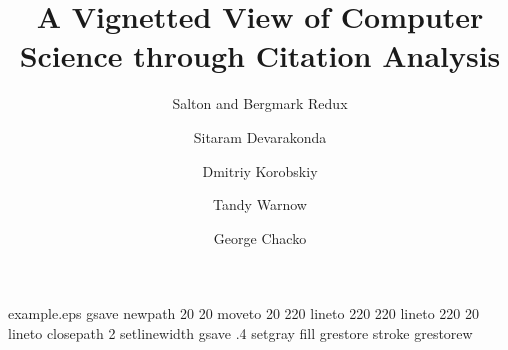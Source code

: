 %
%
%
%
%
\begin{filecontents*}{example.eps}
gsave
newpath
  20 20 moveto
  20 220 lineto
  220 220 lineto
  220 20 lineto
closepath
2 setlinewidth
gsave
  .4 setgray fill
grestore
stroke
grestorew
\end{filecontents*}
%
\RequirePackage{fix-cm}
%
\documentclass[smallextended]{svjour3}       %
%
\smartqed  %
%
\usepackage{graphicx}
\usepackage{xcolor}
\usepackage{listings}
%
%
%
%
%


\title{A Vignetted View of Computer Science through Citation Analysis}
\subtitle{Salton and Bergmark Redux}

\author{Sitaram Devarakonda  \and
	Dmitriy Korobskiy \and
        Tandy Warnow \and
        George Chacko }


